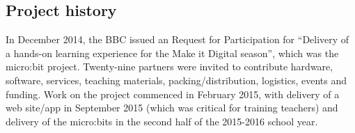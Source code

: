




\subsection{Project history}

In December 2014, the BBC issued an Request for Participation
for ``Delivery of a hands-on learning experience for the Make it Digital season'',
which was the micro:bit project.
Twenty-nine partners were invited to contribute hardware, software, services,
teaching materials, packing/distribution, logistics, events and funding.
Work on the project commenced in February 2015, with delivery of
a web site/app in September 2015 (which was critical
for training teachers) and delivery of the micro:bits in the second
half of the 2015-2016 school year.








